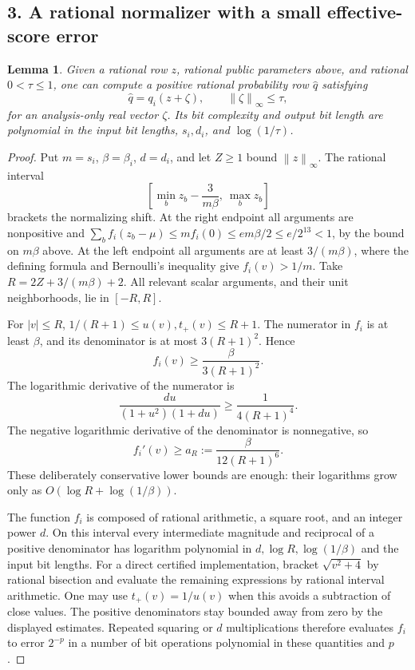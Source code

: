 \documentclass[11pt]{article}
\newcommand{\norm}[1]{\left\lVert#1\right\rVert}
\newtheorem{lemma}[theorem]{Lemma}
\begin{document}
\subsection*{3. A rational normalizer with a small effective-score error}
\begin{lemma}\label{lem:normalization}
Given a rational row $z$, rational public parameters above, and rational
$0<\tau\leq1$, one can compute a positive rational probability row
$\widehat q$ satisfying
\[
 \widehat q=q_i(z+\zeta),\qquad\norm{\zeta}_\infty\leq\tau,
\]
for an analysis-only real vector $\zeta$.  Its bit complexity and output
bit length are polynomial in the input bit lengths, $s_i,d_i$, and
$\log(1/\tau)$.
\end{lemma}
\begin{proof}
Put $m=s_i$, $\beta=\beta_i$, $d=d_i$, and let $Z\geq1$ bound
$\norm z_\infty$.  The rational interval
\[
 \left[\min_bz_b-\frac3{m\beta},\ \max_bz_b\right]
\]
brackets the normalizing shift.  At the right endpoint all arguments
are nonpositive and
$\sum_bf_i(z_b-\mu)\leq mf_i(0)\leq em\beta/2
\leq e/2^{13}<1$, by the bound on $m\beta$ above.
At the left
endpoint all arguments are at least $3/(m\beta)$, where the defining
formula and Bernoulli's inequality give $f_i(v)>1/m$.
Take $R=2Z+3/(m\beta)+2$.
All relevant scalar arguments, and their unit neighborhoods, lie in
$[-R,R]$.

For $|v|\leq R$, $1/(R+1)\leq u(v),t_+(v)\leq R+1$.
The numerator in $f_i$ is at least $\beta$, and its denominator is
at most $3(R+1)^2$.  Hence
\[
 f_i(v)\geq\frac\beta{3(R+1)^2}.
\]
The logarithmic derivative of the numerator is
\[
 \frac{du}{(1+u^2)(1+du)}\geq\frac1{4(R+1)^4}.
\]
The negative logarithmic derivative of the denominator is nonnegative,
so
\begin{equation}\label{eq:derivativefloor}
 f_i'(v)\geq a_R:=\frac\beta{12(R+1)^6}.
\end{equation}
These deliberately conservative lower bounds are enough: their
logarithms grow only as $O(\log R+\log(1/\beta))$.

The function $f_i$ is composed of rational arithmetic, a square root,
and an integer power $d$.  On this interval every intermediate
magnitude and reciprocal of a positive denominator has logarithm
polynomial in $d,\log R,\log(1/\beta)$ and the input bit lengths.
For a direct certified implementation, bracket $\sqrt{v^2+4}$ by
rational bisection and evaluate the remaining expressions by rational
interval arithmetic.  One may use $t_+(v)=1/u(v)$ when this avoids a
subtraction of close values.  The positive denominators stay bounded
away from zero by the displayed estimates.  Repeated squaring or $d$
multiplications therefore evaluates $f_i$ to error $2^{-p}$ in a
number of bit operations polynomial in these quantities and $p$.


\end{proof}
\end{document}
